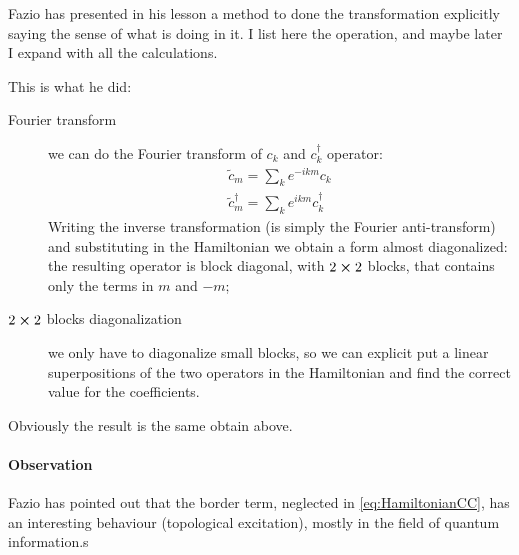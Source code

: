 \documentclass[a4paper,10pt]{article}
\begin{document}
Fazio has presented in his lesson a method to done the transformation explicitly saying the sense of what is doing in it.
I list here the operation, and maybe later I expand with all the calculations.

This is what he did:
\begin{description}
	\item[Fourier transform] we can do the Fourier transform of $c_k$ and $c_k^\dagger$ operator:
	\begin{align}
		\tilde{c}_m = \sum_k e^{-ikm} c_k\\
		\tilde{c}_m^\dagger = \sum_k e^{ikm} c_k^\dagger
	\end{align}
	Writing the inverse transformation (is simply the Fourier anti-transform) and substituting in the Hamiltonian we obtain a form almost diagonalized: the resulting operator is block diagonal, with $2\cross2$ blocks, that contains only the terms in $m$ and $-m$;
	\item[$2\cross2$ blocks diagonalization] we only have to diagonalize small blocks, so we can explicit put a linear superpositions of the two operators in the Hamiltonian and find the correct value for the coefficients.
\end{description}

Obviously the result is the same obtain above.

\paragraph{Observation} Fazio has pointed out that the border term, neglected in  \cref{eq:HamiltonianCC}, has an interesting behaviour (topological excitation), mostly in the field of quantum information.s
\end{document}

